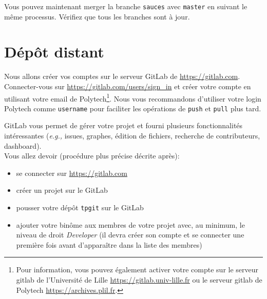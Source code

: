 \documentclass[final, a4paper, openbib, ]{article}
\begin{document}
Vous pouvez maintenant merger la branche \texttt{sauces} avec \texttt{master} en suivant le même processus.
Vérifiez que tous les branches sont à jour.

\section{Dépôt distant}

Nous allons créer vos comptes sur le serveur GitLab de \url{https://gitlab.com}.
Connecter-vous sur \url{https://gitlab.com/users/sign_in} et créer votre compte en utilisant votre email de Polytech\footnote{Pour information, vous pouvez également activer votre compte sur le serveur gitlab de l'Université de Lille \url{https://gitlab.univ-lille.fr} ou le serveur gitlab de Polytech \url{https://archives.plil.fr}.}.
Nous vous recommandons d'utiliser votre login Polytech comme \texttt{username} pour faciliter les opérations de \texttt{push} et \texttt{pull} plus tard.

GitLab vous permet de gérer votre projet et fourni plusieurs fonctionnalités intéressantes (\textit{e.g.,} issues, graphes, édition de fichiers, recherche de contributeurs, dashboard).\\


Vous allez devoir (procédure plus précise décrite après):
\begin{itemize}
\item se connecter sur \url{https://gitlab.com}
\item créer un projet sur le GitLab
\item pousser votre dépôt \texttt{tpgit} sur le GitLab
\item ajouter votre binôme aux membres de votre projet avec, au minimum, le niveau de droit \textit{Developer} (il devra créer son compte et se connecter une première fois avant d'apparaître dans la liste des membres)
\end{itemize}
\end{document}
